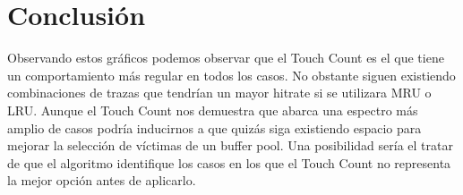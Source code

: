 \section{Conclusión}

Observando estos gráficos podemos observar que el Touch Count es el que tiene un comportamiento más regular en todos los casos. No obstante siguen existiendo combinaciones de trazas que tendrían un mayor hitrate si se utilizara MRU o LRU. Aunque el Touch Count nos demuestra que abarca una espectro más amplio de casos podría inducirnos a que quizás siga existiendo espacio para mejorar la selección de
víctimas de un buffer pool. Una posibilidad sería el tratar de que el algoritmo identifique los casos en los que el Touch Count no representa la mejor opción antes de aplicarlo.



